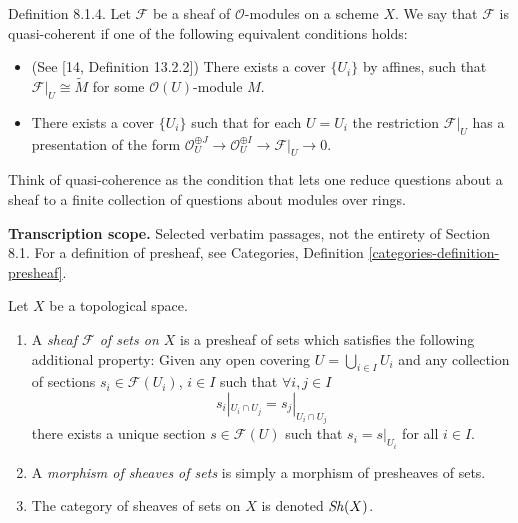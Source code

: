 Definition 8.1.4. Let $\mathcal F$ be a sheaf of $\mathcal O$-modules on a scheme $X$. We say that $\mathcal F$ is quasi-coherent if one of the following equivalent conditions holds:
\begin{itemize}
\item (See [14, Definition 13.2.2]) There exists a cover $\{U_i\}$ by affines, such that $\mathcal F|_U\cong\widetilde M$ for some $\mathcal O(U)$-module $M$.
\item There exists a cover $\{U_i\}$ such that for each $U=U_i$ the restriction $\mathcal F|_U$ has a presentation of the form $\mathcal O_U^{\oplus J}\to\mathcal O_U^{\oplus I}\to\mathcal F|_U\to0$.
\end{itemize}

Think of quasi-coherence as the condition that lets one reduce questions about a sheaf to a finite collection of questions about modules over rings.

\medskip\noindent
{\bf Transcription scope.} Selected verbatim passages, not the entirety of Section 8.1.
For a definition of presheaf,
see Categories, Definition
\ref{categories-definition-presheaf}.

\begin{definition}
\label{definition-sheaf}
Let $X$ be a topological space.
\begin{enumerate}
\item A {\it sheaf $\mathcal{F}$ of sets on
$X$} is a presheaf
of sets which satisfies the following
additional property: Given
any open covering $U = \bigcup_{i \in I} U_i$
and any collection
of sections $s_i \in \mathcal{F}(U_i)$, $i
\in I$ such that
$\forall i, j\in I$
$$
s_i|_{U_i \cap U_j} = s_j|_{U_i \cap U_j}
$$
there exists a unique section $s \in
\mathcal{F}(U)$ such that
$s_i = s|_{U_i}$ for all $i \in I$.
\item A {\it morphism of sheaves of sets} is
simply a
morphism of presheaves of sets.
\item The category of sheaves of sets on $X$
is denoted
$\mathop{\mathit{Sh}}\nolimits(X)$.
\end{enumerate}
\end{definition}


